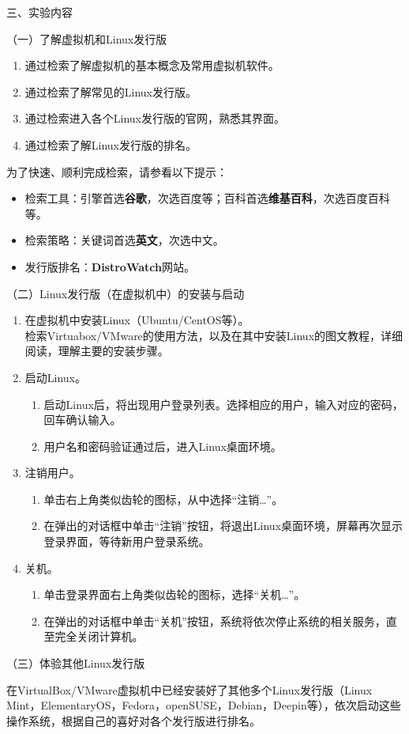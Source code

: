 \vspace{0.2in}
\noindent
三、实验内容

\vspace{0.1in}
（一）了解虚拟机和Linux发行版
\begin{enumerate}
  \item 通过检索了解虚拟机的基本概念及常用虚拟机软件。
  \item 通过检索了解常见的Linux发行版。
  \item 通过检索进入各个Linux发行版的官网，熟悉其界面。
  \item 通过检索了解Linux发行版的排名。
\end{enumerate}

为了快速、顺利完成检索，请参看以下提示：
\begin{itemize}
  \item 检索工具：引擎首选\textbf{谷歌}，次选百度等；百科首选\textbf{维基百科}，次选百度百科等。
  \item 检索策略：关键词首选\textbf{英文}，次选中文。
  \item 发行版排名：\textbf{DistroWatch}网站。
\end{itemize}

\vspace{0.1in}
（二）Linux发行版（在虚拟机中）的安装与启动
\begin{enumerate}
  \item 在虚拟机中安装Linux（Ubuntu/CentOS等）。
\\ 检索Virtuabox/VMware的使用方法，以及在其中安装Linux的图文教程，详细阅读，理解主要的安装步骤。
  \item 启动Linux。
    \begin{enumerate}
      \item 启动Linux后，将出现用户登录列表。选择相应的用户，输入对应的密码，回车确认输入。
      \item 用户名和密码验证通过后，进入Linux桌面环境。
    \end{enumerate}
  \item 注销用户。
    \begin{enumerate}
      \item 单击右上角类似齿轮的图标，从中选择“注销…”。
      \item 在弹出的对话框中单击“注销”按钮，将退出Linux桌面环境，屏幕再次显示登录界面，等待新用户登录系统。
    \end{enumerate}
  \item 关机。
    \begin{enumerate}
      \item 单击登录界面右上角类似齿轮的图标，选择“关机…”。
      \item 在弹出的对话框中单击“关机”按钮，系统将依次停止系统的相关服务，直至完全关闭计算机。
    \end{enumerate}
\end{enumerate}

\vspace{0.1in}
（三）体验其他Linux发行版

在VirtualBox/VMware虚拟机中已经安装好了其他多个Linux发行版（Linux Mint，ElementaryOS，Fedora，openSUSE，Debian，Deepin等），依次启动这些操作系统，根据自己的喜好对各个发行版进行排名。
